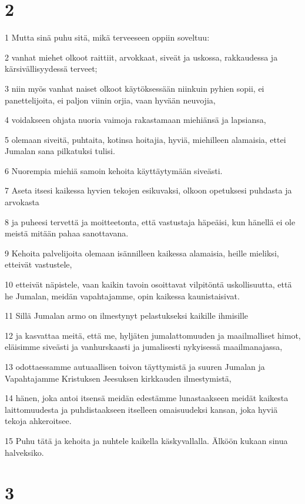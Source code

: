 \chapter{2}

\par 1 Mutta sinä puhu sitä, mikä terveeseen oppiin soveltuu:
\par 2 vanhat miehet olkoot raittiit, arvokkaat, siveät ja uskossa, rakkaudessa ja kärsivällisyydessä terveet;
\par 3 niin myös vanhat naiset olkoot käytöksessään niinkuin pyhien sopii, ei panettelijoita, ei paljon viinin orjia, vaan hyvään neuvojia,
\par 4 voidakseen ohjata nuoria vaimoja rakastamaan miehiänsä ja lapsiansa,
\par 5 olemaan siveitä, puhtaita, kotinsa hoitajia, hyviä, miehilleen alamaisia, ettei Jumalan sana pilkatuksi tulisi.
\par 6 Nuorempia miehiä samoin kehoita käyttäytymään siveästi.
\par 7 Aseta itsesi kaikessa hyvien tekojen esikuvaksi, olkoon opetuksesi puhdasta ja arvokasta
\par 8 ja puheesi tervettä ja moitteetonta, että vastustaja häpeäisi, kun hänellä ei ole meistä mitään pahaa sanottavana.
\par 9 Kehoita palvelijoita olemaan isännilleen kaikessa alamaisia, heille mieliksi, etteivät vastustele,
\par 10 etteivät näpistele, vaan kaikin tavoin osoittavat vilpitöntä uskollisuutta, että he Jumalan, meidän vapahtajamme, opin kaikessa kaunistaisivat.
\par 11 Sillä Jumalan armo on ilmestynyt pelastukseksi kaikille ihmisille
\par 12 ja kasvattaa meitä, että me, hyljäten jumalattomuuden ja maailmalliset himot, eläisimme siveästi ja vanhurskaasti ja jumalisesti nykyisessä maailmanajassa,
\par 13 odottaessamme autuaallisen toivon täyttymistä ja suuren Jumalan ja Vapahtajamme Kristuksen Jeesuksen kirkkauden ilmestymistä,
\par 14 hänen, joka antoi itsensä meidän edestämme lunastaakseen meidät kaikesta laittomuudesta ja puhdistaakseen itselleen omaisuudeksi kansan, joka hyviä tekoja ahkeroitsee.
\par 15 Puhu tätä ja kehoita ja nuhtele kaikella käskyvallalla. Älköön kukaan sinua halveksiko.

\chapter{3}

